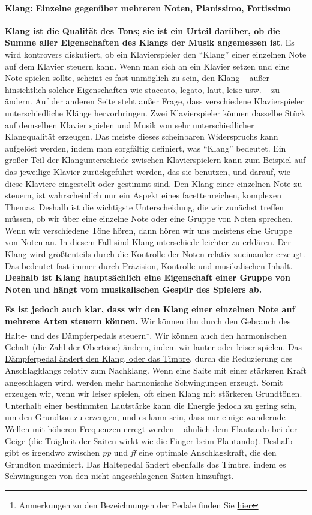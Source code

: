 \paragraph{Klang: Einzelne gegenüber mehreren Noten, Pianissimo, Fortissimo}
\label{c1iii1a2}

\textbf{Klang ist die Qualität des Tons; sie ist ein Urteil darüber, ob die Summe aller Eigenschaften des Klangs der Musik angemessen ist}.
Es wird kontrovers diskutiert, ob ein Klavierspieler den \enquote{Klang} einer einzelnen Note auf dem Klavier steuern kann.
Wenn man sich an ein Klavier setzen und eine Note spielen sollte, scheint es fast unmöglich zu sein, den Klang -- außer hinsichtlich solcher Eigenschaften wie staccato, legato, laut, leise usw. -- zu ändern.
Auf der anderen Seite steht außer Frage, dass verschiedene Klavierspieler unterschiedliche Klänge hervorbringen.
Zwei Klavierspieler können dasselbe Stück auf demselben Klavier spielen und Musik von sehr unterschiedlicher Klangqualität erzeugen.
Das meiste dieses scheinbaren Widerspruchs kann aufgelöst werden, indem man sorgfältig definiert, was \enquote{Klang} bedeutet.
Ein großer Teil der Klangunterschiede zwischen Klavierspielern kann zum Beispiel auf das jeweilige Klavier zurückgeführt werden, das sie benutzen, und darauf, wie diese Klaviere eingestellt oder gestimmt sind.
Den Klang einer einzelnen Note zu steuern, ist wahrscheinlich nur ein Aspekt eines facettenreichen, komplexen Themas.
Deshalb ist die wichtigste Unterscheidung, die wir zunächst treffen müssen, ob wir über eine einzelne Note oder eine Gruppe von Noten sprechen.
Wenn wir verschiedene Töne hören, dann hören wir uns meistens eine Gruppe von Noten an.
In diesem Fall sind Klangunterschiede leichter zu erklären.
Der Klang wird größtenteils durch die Kontrolle der Noten relativ zueinander erzeugt.
Das bedeutet fast immer durch Präzision, Kontrolle und musikalischen Inhalt.
\textbf{Deshalb ist Klang hauptsächlich eine Eigenschaft einer Gruppe von Noten und hängt vom musikalischen Gespür des Spielers ab.}

\textbf{Es ist jedoch auch klar, dass wir den Klang einer einzelnen Note auf mehrere Arten steuern können.}
Wir können ihn durch den Gebrauch des Halte- und des Dämpferpedals steuern\footnote{Anmerkungen zu den Bezeichnungen der Pedale finden Sie \hyperref[Pedale]{hier}}.
Wir können auch den harmonischen Gehalt (die Zahl der Obertöne) ändern, indem wir lauter oder leiser spielen.
Das \hyperref[c1ii24]{Dämpferpedal ändert den Klang, oder das Timbre}, durch die Reduzierung des Anschlagklangs relativ zum Nachklang.
Wenn eine Saite mit einer stärkeren Kraft angeschlagen wird, werden mehr harmonische Schwingungen erzeugt.
Somit erzeugen wir, wenn wir leiser spielen, oft einen Klang mit stärkeren Grundtönen.
Unterhalb einer bestimmten Lautstärke kann die Energie jedoch zu gering sein, um den Grundton zu erzeugen, und es kann sein, dass nur einige wandernde Wellen mit höheren Frequenzen erregt werden -- ähnlich dem Flautando bei der Geige (die Trägheit der Saiten wirkt wie die Finger beim Flautando).
Deshalb gibt es irgendwo zwischen \textit{pp} und \textit{ff} eine optimale Anschlagskraft, die den Grundton maximiert.
Das Haltepedal ändert ebenfalls das Timbre, indem es Schwingungen von den nicht angeschlagenen Saiten hinzufügt.

